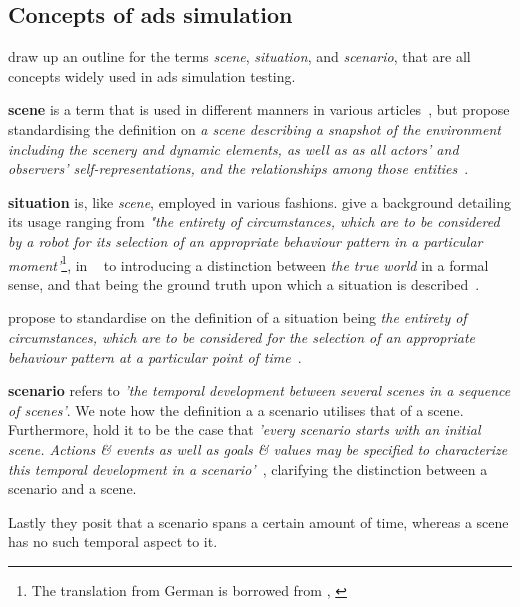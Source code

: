 \subsection{Concepts of \acrshort{ads} simulation}\label{sec:adsSimConcepts}

\citeauthor{scenes} draw up an outline for the terms \textit{scene}, \textit{situation}, and
\textit{scenario}, that are all concepts widely used in \acrshort{ads} simulation testing.

\textbf{scene} is a term that is used in different manners in various
articles~\cite[982]{scenes}, but \citeauthor{scenes} propose standardising the definition on
\textit{a scene describing a snapshot of the environment including the scenery and dynamic elements,
    as well as  as all actors’ and observers’ self-representations, and the relationships among those entities}~\cite[983]{scenes}.

\textbf{situation} is, like \textit{scene}, employed in various fashions. \citeauthor{scenes}
give a background detailing its usage ranging from \textit{"the entirety of circumstances,
    which are to be considered by a robot for its selection of an appropriate behaviour pattern in a
    particular moment'}\footnote{The translation from German is borrowed from \citeauthor{scenes},
    \cite[984]{scenes}}, in  \citeauthor{scenarioTysk}~\cite[3]{scenarioTysk} to
\citeauthor{schmidtScenario} introducing a distinction between \textit{the true world} in a formal
sense, and that being the ground truth upon which a situation is
described~\cite[892]{schmidtScenario}.

\citeauthor{scenes} propose to standardise on the definition of a situation being \textit{
    the entirety of circumstances, which  are to be considered for the selection of an
    appropriate behaviour pattern at a particular point of time}~\cite[985]{scenes}.

\textbf{scenario} refers to \textit{'the temporal development between several scenes in a sequence
    of scenes'}\cite[986]{scenes}. We note how the definition a a scenario utilises that of a scene.
Furthermore, \citeauthor{scenes} hold it to be the case that \textit{'every scenario starts with an
    initial scene. Actions \& events as well as goals \& values may be  specified to characterize
    this temporal development in a scenario'}~\cite[986]{scenes}, clarifying the distinction
between a scenario and a scene.

Lastly they posit that a scenario spans a certain amount of time, whereas a scene has no such
temporal aspect to it.


